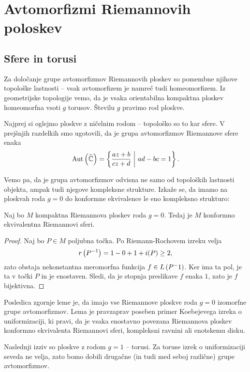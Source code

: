\section{Avtomorfizmi Riemannovih poloskev}

\subsection{Sfere in torusi}

Za določanje grupe avtomorfizmov Riemannovih ploskev so pomembne
njihove topološke lastnosti -- vsak avtomorfizem je namreč tudi
homeomorfizem. Iz geometrijske topologije vemo, da je vsaka
orientabilna kompaktna ploskev homeomorfna vsoti $g$ torusov.
Številu $g$ pravimo rod ploskve.

Najprej si oglejmo ploskve z ničelnim rodom -- topološko so to kar
sfere. V prejšnjih razdelkih smo ugotovili, da je grupa
avtomorfizmov Riemannove sfere enaka
\[
\operatorname{Aut} \left(\widehat{\mathbb{C}}\right) = \left\{\frac{az + b}{cz + d}~\middle\vert~ad - bc = 1\right\}.
\]

Vemo pa, da je grupa avtomorfizmov odvisna ne samo od topoloških
lastnosti objekta, ampak tudi njegove kompleksne strukture. Izkaže
se, da imamo na ploskvah roda $g = 0$ do konformne ekvivalence le
eno kompleksno strukturo:

\begin{lema}
Naj bo $M$ kompaktna Riemannova ploskev roda $g = 0$. Tedaj je $M$
konformno ekvivalentna Riemannovi sferi.
\end{lema}

\begin{proof}
Naj bo $P \in M$ poljubna točka. Po Riemann-Rochovem izreku velja
\[
r \left(P^{-1}\right) = 1 - 0 + 1 + i(P) \geq 2,
\]
zato obstaja nekonstantna meromorfna funkcija $f \in L \left(P^-1\right)$.
Ker ima ta pol, je ta v točki $P$ in je enostaven. Sledi, da je
stopnja preslikave $f$ enaka $1$, zato je $f$ bijektivna.
\end{proof}

Posledica zgornje leme je, da imajo vse Riemannove ploskve roda
$g = 0$ izomorfne grupe avtomorfizmov. Lema je pravzaprav poseben
primer Koebejevega izreka o uniformizaciji, ki pravi, da je vsaka
enostavno povezana Riemannova ploskev konformno ekvivalenta
Riemannovi sferi, kompleksni ravnini ali enotskemu disku.

Naslednji izziv so ploskve z rodom $g=1$ -- torusi. Za toruse
izrek o uniformizaciji seveda ne velja, zato bomo dobili drugačne
(in tudi med seboj različne) grupe avtomorfizmov.


